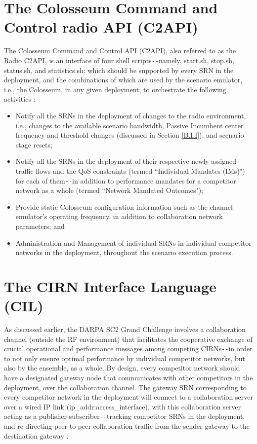 \section{The Colosseum Command and Control radio API (C2API)}\label{B.II}
The Colosseum Command and Control API (C2API), also referred to as the Radio C2API, is an interface of four shell scripts\texttt{-{}-}namely, start.sh, stop.sh, status.sh, and statistics.sh; which should be supported by every SRN in the deployment, and the combinations of which are used by the scenario emulator, i.e., the Colosseum, in any given deployment, to orchestrate the following activities \cite{DARPA:SC2c2api}:
\begin{itemize}
    \item Notify all the SRNs in the deployment of changes to the radio environment, i.e., changes to the available scenario bandwidth, Passive Incumbent center frequency and threshold changes (discussed in Section \ref{B.I.I}), and scenario stage resets;
    \item Notify all the SRNs in the deployment of their respective newly assigned traffic flows and the QoS constraints (termed ``Individual Mandates (IMs)") for each of them\texttt{-{}-}in addition to performance mandates for a competitor network as a whole (termed ``Network Mandated Outcomes");
    \item Provide static Colosseum configuration information such as the channel emulator's operating frequency, in addition to collaboration network parameters; and
    \item Administration and Management of individual SRNs in individual competitor networks in the deployment, throughout the scenario execution process.
\end{itemize}
\section{The CIRN Interface Language (CIL)}\label{B.III}
As discussed earlier, the DARPA SC2 Grand Challenge involves a collaboration channel (outside the RF environment) that facilitates the cooperative exchange of crucial operational and performance messages among competing CIRNs\texttt{-{}-}in order to not only ensure optimal performance by individual competitor networks, but also by the ensemble, as a whole. By design, every competitor network should have a designated gateway node that communicates with other competitors in the deployment, over the collaboration channel. The gateway SRN corresponding to every competitor network in the deployment will connect to a collaboration server over a wired IP link (ip\_addr:access\_interface), with this collaboration server acting as a publisher-subscriber\texttt{-{}-}tracking competitor SRNs in the deployment, and re-directing peer-to-peer collaboration traffic from the sender gateway to the destination gateway \cite{DARPA:SC2collaboration}.


